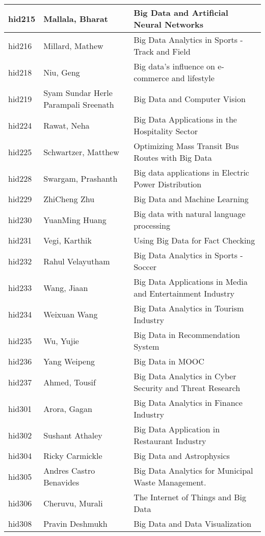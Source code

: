 \documentclass[12pt]{book}
\begin{document}
\begin{footnotesize}
\begin{longtable}{|p{1cm}p{5cm}p{9cm}|}
\hline
hid215 & Mallala, Bharat & Big Data and Artificial Neural Networks  \\
\hline
hid216 & Millard, Mathew & Big Data Analytics in Sports - Track and Field  \\
\hline
hid218 & Niu, Geng & Big data's influence on e-commerce and lifestyle  \\
\hline
hid219 & Syam Sundar Herle Parampali Sreenath & Big Data and Computer Vision  \\
\hline
hid224 & Rawat, Neha & Big Data Applications in the Hospitality Sector  \\
\hline
hid225 & Schwartzer, Matthew & Optimizing Mass Transit Bus Routes with Big Data  \\
\hline
hid228 & Swargam, Prashanth & Big data applications in Electric Power Distribution  \\
\hline
hid229 & ZhiCheng Zhu & Big Data and Machine Learning  \\
\hline
hid230 & YuanMing Huang & Big data with natural language processing  \\
\hline
hid231 & Vegi, Karthik & Using Big Data for Fact Checking  \\
\hline
hid232 & Rahul Velayutham & Big Data Analytics in Sports - Soccer  \\
\hline
hid233 & Wang, Jiaan & Big Data Applications in Media and Entertainment Industry  \\
\hline
hid234 & Weixuan Wang & Big Data Analytics in Tourism Industry  \\
\hline
hid235 & Wu, Yujie & Big Data in Recommendation System  \\
\hline
hid236 & Yang Weipeng & Big Data in MOOC  \\
\hline
hid237 & Ahmed, Tousif & Big Data Analytics in Cyber Security and Threat Research  \\
\hline
hid301 & Arora, Gagan & Big Data Analytics in Finance Industry  \\
\hline
hid302 & Sushant Athaley & Big Data Application in Restaurant Industry  \\
\hline
hid304 & Ricky Carmickle & Big Data and Astrophysics  \\
\hline
hid305 & Andres Castro Benavides & Big Data Analytics for Municipal Waste Management.  \\
\hline
hid306 & Cheruvu, Murali & The Internet of Things and Big Data  \\
\hline
hid308 & Pravin Deshmukh & Big Data and Data Visualization  \\

\end{longtable}
\end{footnotesize}
\end{document}
